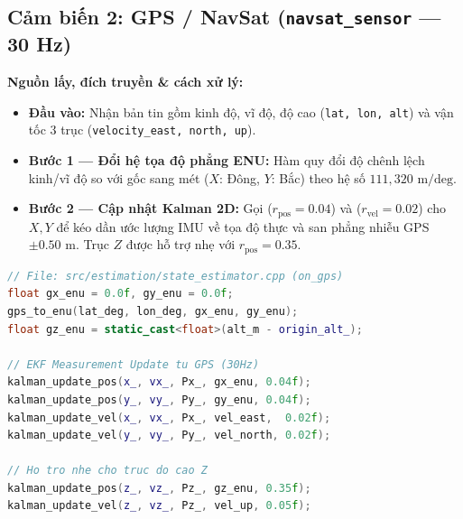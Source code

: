 \documentclass[11pt,a4paper]{article}
\begin{document}
\vspace{1em}

\subsection{Cảm biến 2: GPS / NavSat (\texttt{navsat\_sensor} — 30 Hz)}
\noindent
\begin{minipage}[t]{0.45\textwidth}
\vspace{0pt}
\textbf{Nguồn lấy, đích truyền \& cách xử lý:}
\begin{itemize}
    \item \textbf{Đầu vào:} Nhận bản tin  gồm kinh độ, vĩ độ, độ cao (\texttt{lat, lon, alt}) và vận tốc 3 trục (\texttt{velocity\_east, north, up}).
    \item \textbf{Bước 1 — Đổi hệ tọa độ phẳng ENU:} Hàm  quy đổi độ chênh lệch kinh/vĩ độ so với gốc sang mét ($X$: Đông, $Y$: Bắc) theo hệ số $111{,}320\text{ m/deg}$.
    \item \textbf{Bước 2 — Cập nhật Kalman 2D:} Gọi  ($r_{\text{pos}} = 0.04$) và  ($r_{\text{vel}} = 0.02$) cho $X, Y$ để kéo dần ước lượng IMU về tọa độ thực và san phẳng nhiễu GPS $\pm 0.50\text{ m}$. Trục $Z$ được hỗ trợ nhẹ với $r_{\text{pos}} = 0.35$.
\end{itemize}
\end{minipage}
\hfill
\begin{minipage}[t]{0.52\textwidth}
\vspace{0pt}
\begin{lstlisting}[language=C++, firstnumber=228]
// File: src/estimation/state_estimator.cpp (on_gps)
float gx_enu = 0.0f, gy_enu = 0.0f;
gps_to_enu(lat_deg, lon_deg, gx_enu, gy_enu);
float gz_enu = static_cast<float>(alt_m - origin_alt_);

// EKF Measurement Update tu GPS (30Hz)
kalman_update_pos(x_, vx_, Px_, gx_enu, 0.04f);
kalman_update_pos(y_, vy_, Py_, gy_enu, 0.04f);
kalman_update_vel(x_, vx_, Px_, vel_east,  0.02f);
kalman_update_vel(y_, vy_, Py_, vel_north, 0.02f);

// Ho tro nhe cho truc do cao Z
kalman_update_pos(z_, vz_, Pz_, gz_enu, 0.35f);
kalman_update_vel(z_, vz_, Pz_, vel_up, 0.05f);
\end{lstlisting}
\end{minipage}

\vspace{1em}
\end{document}

